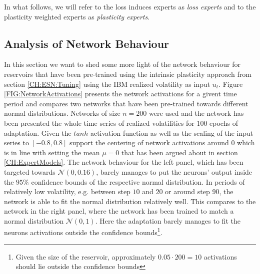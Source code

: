 In what follows, we will refer to the loss induces experts as \textit{loss experts} and to the plasticity weighted experts as \textit{plasticity experts}.

\subsection{Analysis of Network Behaviour}

In this section we want to shed some more light of the network behaviour for reservoirs that have been pre-trained using the intrinsic plasticity approach from section \ref{CH:ESN:Tuning} using the IBM realized volatility as input $u_t$.
Figure \ref{FIG:NetworkActivations} presents the network activations for a givent time period and compares two networks that have been pre-trained towards different normal distributions. Networks of size $n=200$ were used and the network has been presented the whole time series of realized volatilities for $100$ epochs of adaptation. Given the $tanh$ activation function as well as the scaling of the input series to $[-0.8, 0.8]$ support the centering of network activations around $0$ which is in line with setting the mean $\mu = 0$ that has been argued about in section \ref{CH:ExpertModels}. The network behaviour for the left panel, which has been targeted towards $\mathcal{N}(0, 0.16)$, barely manages to put the neurons' output inside the $95\%$ confidence bounds of the respective normal distribution. In periods of relatively low volatility, e.g. between step $10$ and $20$ or around step $90$, the network is able to fit the normal distribution relatively well. This compares to the network in the right panel, where the network has been trained to match a normal distribution $\mathcal{N}(0,1)$. Here the adaptation barely manages to fit the neurons activations outside the confidence bounds\footnote{Given the size of the reservoir, approximately $0.05\cdot 200 = 10$ activations should lie outside the confidence bounds}.



